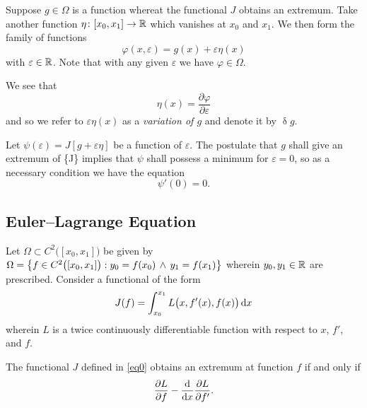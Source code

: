 Suppose \(g \in \Omega\) is a function whereat the functional \(J\) obtains an extremum. Take another function
\(\map{\eta}{[x_0, x_1]}{\setreal}\) which vanishes at \(x_0\) and \(x_1\). We then form the family of functions
\[
  \varphi(x, \varepsilon) = g(x) + \varepsilon \eta(x)
\]
with \(\varepsilon \in \setreal\). Note that with any given \(\varepsilon\) we have \(\varphi \in \Omega\).

We see that
\[
  \eta(x) = \frac{\partial \varphi}{\partial \varepsilon}
\]
and so we refer to \(\varepsilon \eta(x)\) as a \emph{variation of \(g\)} and denote it by \(\updelta g\).

Let \(\psi(\varepsilon) = J[g + \varepsilon \eta]\) be a function of \(\varepsilon\). The postulate that \(g\) shall
give an extremum of \{J\} implies that \(\psi\) shall possess a minimum for \(\varepsilon = 0\), so as a necessary
condition we have the equation
\[
  \psi'(0) = 0.
\]

\subsection{Euler--Lagrange Equation}

Let \(\Omega \subset C^2\big([x_0, x_1]\big)\) be given by \(\Omega = \set*{f \in C^2\big([x_0, x_1]\big) : y_0 = f(x_0)
\, \land \, y_1 = f(x_1)}\) wherein \(y_0, y_1 \in \setreal\) are prescribed. Consider a functional of the form
\begin{align}
  \label{eq0}
  J(f) = \int_{x_0}^{x_1} L\big(x, f'(x), f(x)\big) \diff x
\end{align}
wherein \(L\) is a twice continuously differentiable function with respect to \(x\), \(f'\), and \(f\).

  The functional \(J\) defined in \eqref{eq0} obtains an extremum at function \(f\) if and only if
  \[
    \frac{\partial L}{\partial f} - \frac{\diff}{\diff x} \frac{\partial L}{\partial f'}.
  \]
\Eth

\Edc
